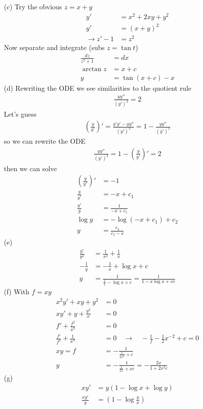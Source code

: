 \documentclass[10pt,a4paper]{book}
\theoremstyle{definition}
\begin{document}
(c) Try the obvious $z=x+y$
\begin{align}
y'&=x^2+2xy+y^2\\
y'&=(x+y)^2\\
\rightarrow z'-1&=z^2
\end{align}
Now separate and integrate (subs $z=\tan t$)
\begin{align}
\frac{dz}{z^2+1}&=dx\\
\arctan z&=x+c\\
y&=\tan(x+c)-x
\end{align}
(d) Rewriting the ODE we see similarities to the quotient rule
\begin{align}
\frac{yy''}{(y')^2}=2
\end{align}
Let's guess
\begin{align}
\left(\frac{y}{y'}\right)'=\frac{y'y'-yy''}{(y')^2}=1-\frac{yy''}{(y')^2}
\end{align}
so we can rewrite the ODE
\begin{align}
\frac{yy''}{(y')^2}=1-\left(\frac{y}{y'}\right)'=2
\end{align}
then we can solve
\begin{align}
\left(\frac{y}{y'}\right)'&=-1\\
\frac{y}{y'}&=-x+c_1\\
\frac{y'}{y}&=\frac{1}{-x+c_1}\\
\log y&=-\log(-x+c_1)+c_2\\
y&=\frac{c_3}{c_1-x}
\end{align}
(e)
\begin{align}
\frac{y'}{y^2}&=\frac{1}{x^2}+\frac{1}{x}\\
-\frac{1}{y}&=-\frac{1}{x}+\log x+c\\
y&=\frac{1}{\frac{1}{x}-\log x+c}=\frac{1}{1-x\log x+xc}
\end{align}
(f) With $f=xy$
\begin{align}
x^2y'+xy+y^2&=0\\
xy'+y+\frac{y^2}{x}&=0\\
f'+\frac{f^2}{x^3}&=0\\
\frac{f'}{f^2}+\frac{1}{x^3}&=0
\quad\rightarrow\quad-\frac{1}{f}-\frac{1}{2}x^{-2}+c=0\\
xy=f&=-\frac{1}{\frac{1}{2x^2}+c}\\
y&=-\frac{1}{\frac{1}{2x}+xc}=-\frac{2x}{1+2x^2c}
\end{align}
(g)
\begin{align}
xy'&=y(1-\log x+\log y)\\
\frac{xy'}{y}&=(1-\log\frac{y}{x})
\end{align}
\end{document}
